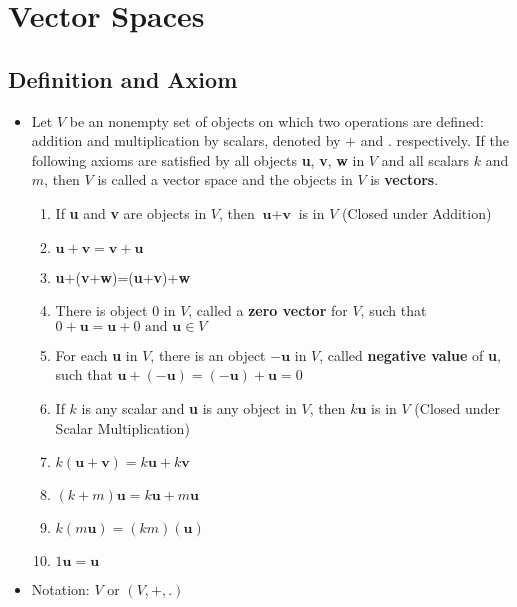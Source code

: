 \documentclass[a4paper,12pt]{article}
\begin{document}
\section*{Vector Spaces}
\subsection*{Definition and Axiom}
\begin{itemize}
  \item Let \(V\) be an nonempty set of objects on which two operations are defined: addition and multiplication by scalars, denoted by \(+\) and \(.\) respectively. If the following axioms are satisfied by all objects \textbf{u}, \textbf{v}, \textbf{w} in \(V\) and all scalars \(k\) and \(m\), then \(V\) is called a vector space and the objects in \(V\) is \textbf{vectors}. \begin{enumerate}
          \item If \textbf{u} and \textbf{v} are objects in \(V\), then \(\textbf{u}+\textbf{v}\) is in \(V\) (Closed under Addition)
          \item \(\textbf{u}+\textbf{v}=\textbf{v}+\textbf{u}\)
          \item \textbf{u}+(\textbf{v}+\textbf{w})=(\textbf{u}+\textbf{v})+\textbf{w}
          \item There is object \(0\) in \(V\), called a \textbf{zero vector} for \(V\), such that \(0+\textbf{u}=\textbf{u}+0 \text{ and } \textbf{u} \in V \)
          \item For each \textbf{u} in \(V\), there is an object \(-\textbf{u}\) in \(V\), called \textbf{negative value} of \textbf{u}, such that \(\textbf{u}+(-\textbf{u})=(-\textbf{u})+\textbf{u}=0\)
          \item If \(k\) is any scalar and \textbf{u} is any object in \(V\), then \(k\textbf{u}\) is in \(V\) (Closed under Scalar Multiplication)
                \item\(k(\textbf{u}+\textbf{v})=k\textbf{u}+k\textbf{v}\)
          \item \((k+m)\textbf{u}=k\textbf{u}+m\textbf{u}\)
          \item \(k(m\textbf{u})=(km)(\textbf{u})\)
          \item \(1\textbf{u}=\textbf{u}\)
        \end{enumerate}
  \item Notation: \(V\) or \((V, +, .)\)
\end{itemize}
\end{document}
